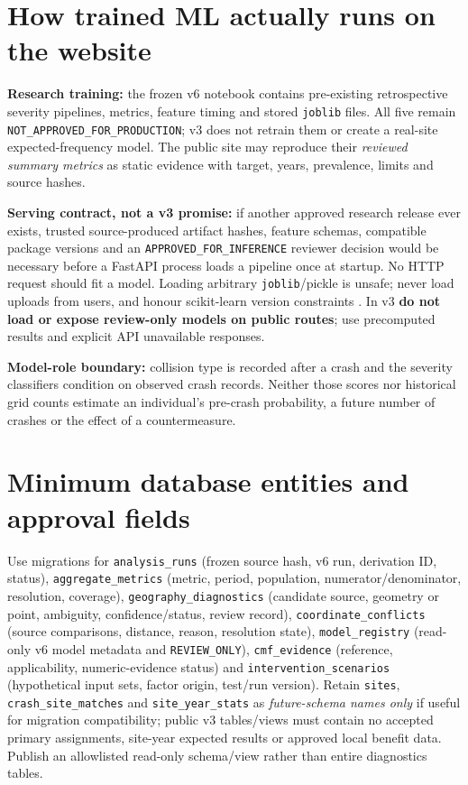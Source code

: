 \documentclass[11pt,a4paper,openany]{report}
\newcommand{\pathcode}[1]{\nolinkurl{#1}}
\begin{document}
\section{How trained ML actually runs on the website}
\textbf{Research training:} the frozen v6 notebook contains pre-existing retrospective severity pipelines, metrics, feature timing and stored \pathcode{joblib} files. All five remain \pathcode{NOT_APPROVED_FOR_PRODUCTION}; v3 does not retrain them or create a real-site expected-frequency model. The public site may reproduce their \emph{reviewed summary metrics} as static evidence with target, years, prevalence, limits and source hashes.

\textbf{Serving contract, not a v3 promise:} if another approved research release ever exists, trusted source-produced artifact hashes, feature schemas, compatible package versions and an \pathcode{APPROVED_FOR_INFERENCE} reviewer decision would be necessary before a FastAPI process loads a pipeline once at startup. No HTTP request should fit a model. Loading arbitrary \pathcode{joblib}/pickle is unsafe; never load uploads from users, and honour scikit-learn version constraints \cite{Sklearn}. In v3 \textbf{do not load or expose review-only models on public routes}; use precomputed results and explicit API unavailable responses.

\textbf{Model-role boundary:} collision type is recorded after a crash and the severity classifiers condition on observed crash records. Neither those scores nor historical grid counts estimate an individual's pre-crash probability, a future number of crashes or the effect of a countermeasure.

\section{Minimum database entities and approval fields}
Use migrations for \pathcode{analysis_runs} (frozen source hash, v6 run, derivation ID, status), \pathcode{aggregate_metrics} (metric, period, population, numerator/denominator, resolution, coverage), \pathcode{geography_diagnostics} (candidate source, geometry or point, ambiguity, confidence/status, review record), \pathcode{coordinate_conflicts} (source comparisons, distance, reason, resolution state), \pathcode{model_registry} (read-only v6 model metadata and \pathcode{REVIEW_ONLY}), \pathcode{cmf_evidence} (reference, applicability, numeric-evidence status) and \pathcode{intervention_scenarios} (hypothetical input sets, factor origin, test/run version). Retain \pathcode{sites}, \pathcode{crash_site_matches} and \pathcode{site_year_stats} as \emph{future-schema names only} if useful for migration compatibility; public v3 tables/views must contain no accepted primary assignments, site-year expected results or approved local benefit data. Publish an allowlisted read-only schema/view rather than entire diagnostics tables.
\end{document}
